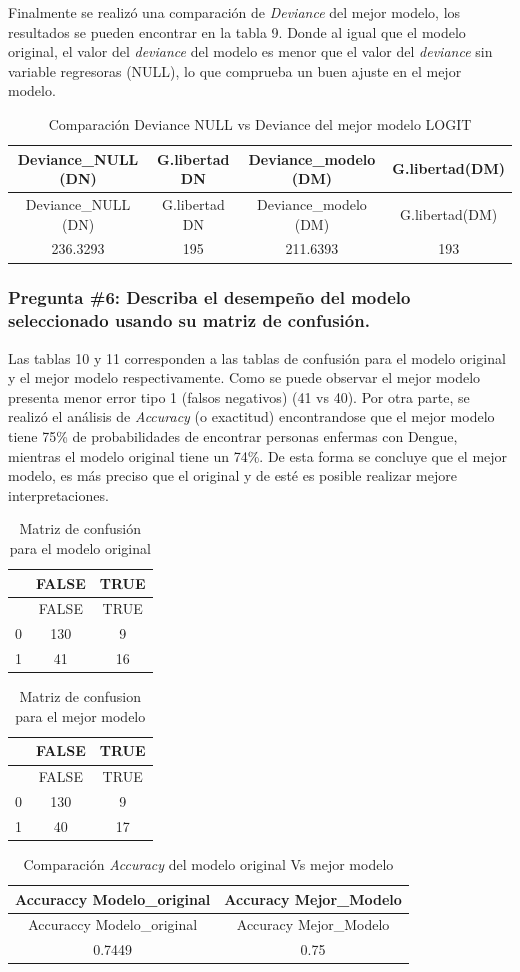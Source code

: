 \documentclass[
]{article}
\begin{document}
Finalmente se realizó una comparación de \emph{Deviance} del mejor
modelo, los resultados se pueden encontrar en la tabla 9. Donde al igual
que el modelo original, el valor del \emph{deviance} del modelo es menor
que el valor del \emph{deviance} sin variable regresoras (NULL), lo que
comprueba un buen ajuste en el mejor modelo.

\begin{longtable}[]{@{}cccc@{}}
\caption{Comparación Deviance NULL vs Deviance del mejor modelo
LOGIT}\tabularnewline
\toprule
Deviance\_NULL (DN) & G.libertad DN & Deviance\_modelo (DM) &
G.libertad(DM)\tabularnewline
\midrule
\endfirsthead
\toprule
Deviance\_NULL (DN) & G.libertad DN & Deviance\_modelo (DM) &
G.libertad(DM)\tabularnewline
\midrule
\endhead
236.3293 & 195 & 211.6393 & 193\tabularnewline
\bottomrule
\end{longtable}

\hypertarget{pregunta-6-describa-el-desempeuxf1o-del-modelo-seleccionado-usando-su-matriz-de-confusiuxf3n.}{%
\subsubsection{Pregunta \#6: Describa el desempeño del modelo
seleccionado usando su matriz de
confusión.}\label{pregunta-6-describa-el-desempeuxf1o-del-modelo-seleccionado-usando-su-matriz-de-confusiuxf3n.}}

Las tablas 10 y 11 corresponden a las tablas de confusión para el modelo
original y el mejor modelo respectivamente. Como se puede observar el
mejor modelo presenta menor error tipo 1 (falsos negativos) (41 vs 40).
Por otra parte, se realizó el análisis de \emph{Accuracy} (o exactitud)
encontrandose que el mejor modelo tiene 75\% de probabilidades de
encontrar personas enfermas con Dengue, mientras el modelo original
tiene un 74\%. De esta forma se concluye que el mejor modelo, es más
preciso que el original y de esté es posible realizar mejore
interpretaciones.

\begin{longtable}[]{@{}lcc@{}}
\caption{Matriz de confusión para el modelo original}\tabularnewline
\toprule
& FALSE & TRUE\tabularnewline
\midrule
\endfirsthead
\toprule
& FALSE & TRUE\tabularnewline
\midrule
\endhead
0 & 130 & 9\tabularnewline
1 & 41 & 16\tabularnewline
\bottomrule
\end{longtable}

\begin{longtable}[]{@{}lcc@{}}
\caption{Matriz de confusion para el mejor modelo}\tabularnewline
\toprule
& FALSE & TRUE\tabularnewline
\midrule
\endfirsthead
\toprule
& FALSE & TRUE\tabularnewline
\midrule
\endhead
0 & 130 & 9\tabularnewline
1 & 40 & 17\tabularnewline
\bottomrule
\end{longtable}

\begin{longtable}[]{@{}cc@{}}
\caption{Comparación \emph{Accuracy} del modelo original Vs mejor
modelo}\tabularnewline
\toprule
Accuraccy Modelo\_original & Accuracy Mejor\_Modelo\tabularnewline
\midrule
\endfirsthead
\toprule
Accuraccy Modelo\_original & Accuracy Mejor\_Modelo\tabularnewline
\midrule
\endhead
0.7449 & 0.75\tabularnewline
\bottomrule
\end{longtable}
\end{document}
